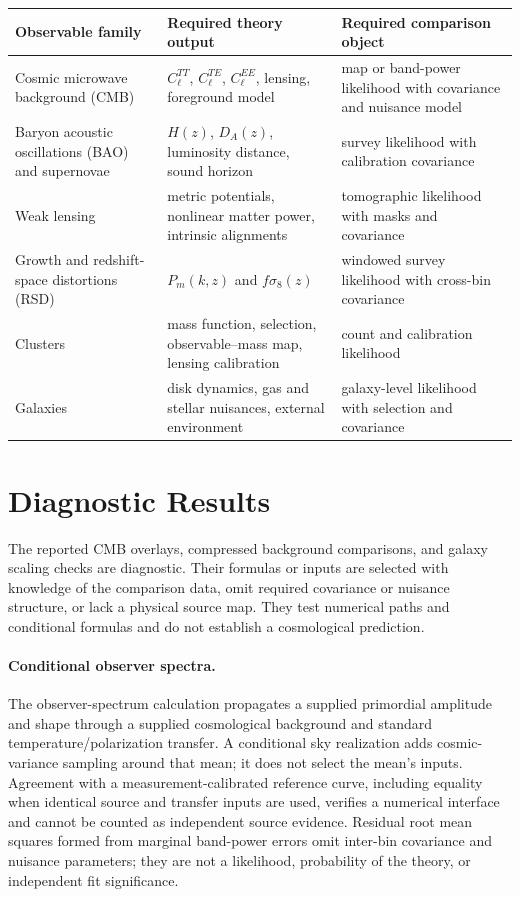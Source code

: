 \documentclass[11pt]{article}
\begin{document}
\begin{center}
\begin{tabularx}{\textwidth}{@{}l>{\raggedright\arraybackslash}X>{\raggedright\arraybackslash}X@{}}
\toprule
Observable family & Required theory output & Required comparison object \\
\midrule
Cosmic microwave background (CMB) & $C_\ell^{TT}$, $C_\ell^{TE}$, $C_\ell^{EE}$, lensing, foreground model &
map or band-power likelihood with covariance and nuisance model \\
Baryon acoustic oscillations (BAO) and supernovae & $H(z)$, $D_A(z)$, luminosity distance, sound horizon &
survey likelihood with calibration covariance \\
Weak lensing & metric potentials, nonlinear matter power, intrinsic alignments &
tomographic likelihood with masks and covariance \\
Growth and redshift-space distortions (RSD) & $P_m(k,z)$ and $f\sigma_8(z)$ &
windowed survey likelihood with cross-bin covariance \\
Clusters & mass function, selection, observable--mass map, lensing calibration &
count and calibration likelihood \\
Galaxies & disk dynamics, gas and stellar nuisances, external environment &
galaxy-level likelihood with selection and covariance \\
\bottomrule
\end{tabularx}
\end{center}

\section{Diagnostic Results}

The reported CMB overlays, compressed background comparisons, and galaxy
scaling checks are diagnostic. Their formulas or inputs are selected with knowledge of
the comparison data, omit required covariance or nuisance structure, or lack a
physical source map. They test numerical paths and conditional formulas and
do not establish a cosmological prediction.

\paragraph{Conditional observer spectra.}
The observer-spectrum calculation propagates a supplied primordial
amplitude and shape through a supplied cosmological background and standard
temperature/polarization transfer. A conditional sky realization adds
cosmic-variance sampling around that mean; it does not select the mean's
inputs. Agreement with a measurement-calibrated reference curve, including
equality when identical source and transfer inputs are used, verifies a
numerical interface and cannot be counted as independent source evidence.
Residual root mean squares formed from marginal band-power errors omit
inter-bin covariance and nuisance parameters; they are not a likelihood,
probability of the theory, or independent fit significance.
\end{document}
